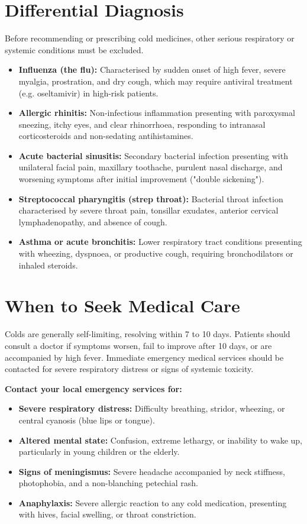 \section*{Differential Diagnosis}
Before recommending or prescribing cold medicines, other serious respiratory or systemic conditions must be excluded.
\begin{itemize}
    \item \textbf{Influenza (the flu):} Characterised by sudden onset of high fever, severe myalgia, prostration, and dry cough, which may require antiviral treatment (e.g. oseltamivir) in high-risk patients.
    \item \textbf{Allergic rhinitis:} Non-infectious inflammation presenting with paroxysmal sneezing, itchy eyes, and clear rhinorrhoea, responding to intranasal corticosteroids and non-sedating antihistamines.
    \item \textbf{Acute bacterial sinusitis:} Secondary bacterial infection presenting with unilateral facial pain, maxillary toothache, purulent nasal discharge, and worsening symptoms after initial improvement ("double sickening").
    \item \textbf{Streptococcal pharyngitis (strep throat):} Bacterial throat infection characterised by severe throat pain, tonsillar exudates, anterior cervical lymphadenopathy, and absence of cough.
    \item \textbf{Asthma or acute bronchitis:} Lower respiratory tract conditions presenting with wheezing, dyspnoea, or productive cough, requiring bronchodilators or inhaled steroids.
\end{itemize}

\section*{When to Seek Medical Care}
Colds are generally self-limiting, resolving within 7 to 10 days. Patients should consult a doctor if symptoms worsen, fail to improve after 10 days, or are accompanied by high fever. Immediate emergency medical services should be contacted for severe respiratory distress or signs of systemic toxicity.

\textbf{Contact your local emergency services for:}
\begin{itemize}
    \item \textbf{Severe respiratory distress:} Difficulty breathing, stridor, wheezing, or central cyanosis (blue lips or tongue).
    \item \textbf{Altered mental state:} Confusion, extreme lethargy, or inability to wake up, particularly in young children or the elderly.
    \item \textbf{Signs of meningismus:} Severe headache accompanied by neck stiffness, photophobia, and a non-blanching petechial rash.
    \item \textbf{Anaphylaxis:} Severe allergic reaction to any cold medication, presenting with hives, facial swelling, or throat constriction.
\end{itemize}

